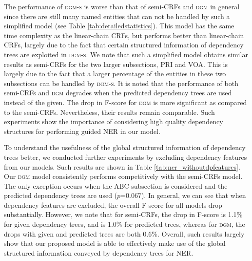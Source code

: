 The performance of \textsc{dgm-s} is worse than that of semi-CRFs and \textsc{dgm} in general since there are still 
many named entities that can not be handled by such a simplified model (see Table \ref{tab:detailedstatistics}).
This model has the same time complexity as the linear-chain CRFs, but performs better than linear-chain CRFs, largely due to the fact that certain structured information of dependency trees are exploited in \textsc{dgm-s}.
We note that such a simplified model obtains similar results as semi-CRFs for the two larger subsections, PRI and VOA.
This is largely due to the fact that a larger percentage of the entities in these two subsections can be handled by \textsc{dgm-s}.
It is noted that the performance of both semi-CRFs and \textsc{dgm} degrades when the predicted dependency trees are used instead of the given.
The drop in F-score for \textsc{dgm} is more significant as compared to the semi-CRFs.
Nevertheless, their results remain comparable.
Such experiments show the importance of considering high quality dependency structures for performing guided NER in our model.

To understand the usefulness of the global structured information of dependency trees better, we conducted further experiments by excluding dependency features from our models.
Such results are shown in Table \ref{tab:ner_withoutdpfeatures}.
Our \textsc{dgm} model consistently performs competitively with the semi-CRFs model. 
The only exception occurs when the ABC subsection is considered and the predicted dependency trees are used ($p$=0.067).
In general, we can see that when dependency features are excluded, the overall F-score for all models drop substantially.
However, we note that for semi-CRFs, the drop in F-score is 1.1\% for given dependency trees, and is 1.0\% for predicted trees,
whereas for \textsc{dgm}, the drops with given and predicted trees are both 0.6\%.
Overall, such results largely show that our proposed  model is able to effectively make use of the global structured information conveyed by dependency trees for NER. 

